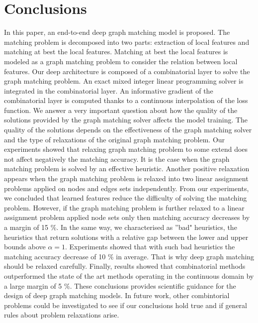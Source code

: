 \documentclass[times,onecolumn,final,authoryear]{article}
\theoremstyle{definition}
\begin{document}
\section{Conclusions}
In this paper, an end-to-end deep graph matching model is proposed. The matching problem is decomposed into two parts: extraction of local features and matching at best the local features. Matching at best the local features is modeled as a graph matching problem to consider the relation between local features. Our deep architecture is composed of a combinatorial layer to solve the graph matching problem. An exact mixed integer linear programming solver is integrated in the combinatorial layer. An informative gradient of the combinatorial layer is computed thanks to a continuous interpolation of the loss function. We answer a very important question about how the quality of the solutions provided by the graph matching solver affects the model training. The quality of the solutions depends on the effectiveness of the graph matching solver and the type of relaxations of the original graph matching problem. Our experiments showed that relaxing graph matching problem to some extend does not affect negatively the matching accuracy. It is the case when the graph matching problem is solved by an effective heuristic. Another positive relaxation appears when the graph matching problem is relaxed into two linear assignment problems applied on nodes and edges sets independently. From our experiments, we concluded that learned features reduce the difficulty of solving the matching problem. However, if the graph matching problem is further relaxed to a linear assignment problem applied node sets only then matching accuracy decreases by a margin of 15 \%. In the same way, we characterised as ''bad" heuristics, the heuristics that return solutions with a relative gap between the lower and upper bounds above $\alpha=1$. Experiments showed that with such bad heuristics the matching accuracy decrease of 10 \% in average. That is why deep graph matching should be relaxed carefully. Finally, results showed that combinatorial methods outperformed the state of the art methods operating in the continuous domain by a large margin of 5 \%. These conclusions provides scientific guidance for the design of deep graph matching models.
In future work, other combintorial problems could be investigated to see if our conclusions hold true and if general rules about problem relaxations arise.

\end{document}
